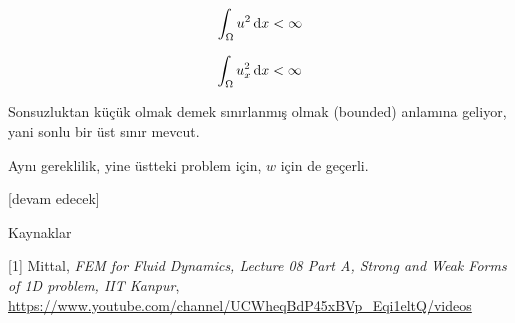 \documentclass[12pt,fleqn]{article}\usepackage{../../common}
\begin{document}
$$
\int_\Omega u^2 \,\mathrm{d} x < \infty
$$

$$
\int_\Omega u_x^2 \,\mathrm{d} x < \infty
$$

Sonsuzluktan küçük olmak demek sınırlanmış olmak (bounded) anlamına geliyor,
yani sonlu bir üst sınır mevcut.

Aynı gereklilik, yine üstteki problem için, $w$ için de geçerli.




[devam edecek]

Kaynaklar

[1] Mittal, {\em FEM for Fluid Dynamics, Lecture 08 Part A, Strong and Weak Forms of 1D problem, IIT Kanpur},
    \url{https://www.youtube.com/channel/UCWheqBdP45xBVp_Eqi1eltQ/videos}
\end{document}
